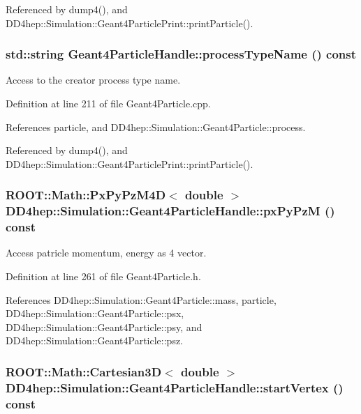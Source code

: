 Referenced by dump4(), and DD4hep::Simulation::Geant4ParticlePrint::printParticle().\hypertarget{class_d_d4hep_1_1_simulation_1_1_geant4_particle_handle_a0f3b949e212e645bf8fe817f2cb4202c}{
\subsubsection[{processTypeName}]{\setlength{\rightskip}{0pt plus 5cm}std::string Geant4ParticleHandle::processTypeName () const}}
\label{class_d_d4hep_1_1_simulation_1_1_geant4_particle_handle_a0f3b949e212e645bf8fe817f2cb4202c}


Access to the creator process type name. 

Definition at line 211 of file Geant4Particle.cpp.

References particle, and DD4hep::Simulation::Geant4Particle::process.

Referenced by dump4(), and DD4hep::Simulation::Geant4ParticlePrint::printParticle().\hypertarget{class_d_d4hep_1_1_simulation_1_1_geant4_particle_handle_a72503948f5442a6cd160880e173f2889}{
\subsubsection[{pxPyPzM}]{\setlength{\rightskip}{0pt plus 5cm}ROOT::Math::PxPyPzM4D$<$ double $>$ DD4hep::Simulation::Geant4ParticleHandle::pxPyPzM () const}}
\label{class_d_d4hep_1_1_simulation_1_1_geant4_particle_handle_a72503948f5442a6cd160880e173f2889}


Access patricle momentum, energy as 4 vector. 

Definition at line 261 of file Geant4Particle.h.

References DD4hep::Simulation::Geant4Particle::mass, particle, DD4hep::Simulation::Geant4Particle::psx, DD4hep::Simulation::Geant4Particle::psy, and DD4hep::Simulation::Geant4Particle::psz.\hypertarget{class_d_d4hep_1_1_simulation_1_1_geant4_particle_handle_a04c1d0f57ad6792a18bf7baec527ea13}{
\subsubsection[{startVertex}]{\setlength{\rightskip}{0pt plus 5cm}ROOT::Math::Cartesian3D$<$ double $>$ DD4hep::Simulation::Geant4ParticleHandle::startVertex () const}}
\label{class_d_d4hep_1_1_simulation_1_1_geant4_particle_handle_a04c1d0f57ad6792a18bf7baec527ea13}


